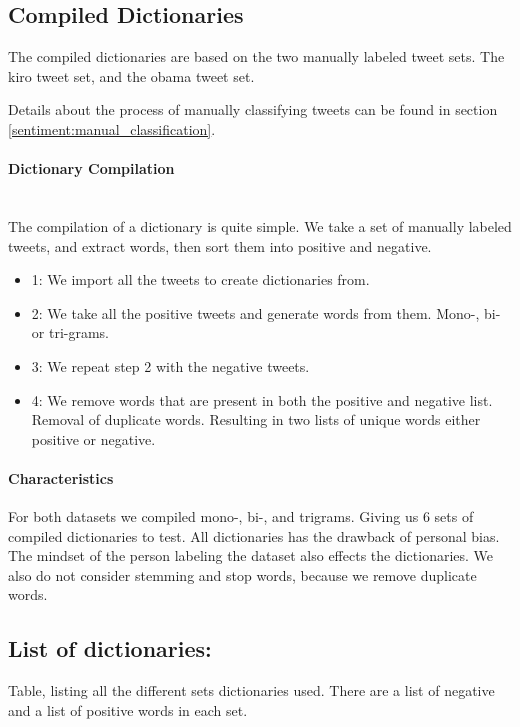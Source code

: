 \subsection{Compiled Dictionaries}
The compiled dictionaries are based on the two manually labeled tweet sets. The
kiro tweet set, and the obama tweet set.

Details about the process of manually classifying tweets can be found in section
\ref{sentiment:manual_classification}.

\paragraph{Dictionary Compilation}
\hspace{0pt}\\
The compilation of a dictionary is quite simple. We take a set of manually
labeled tweets, and extract words, then sort them into positive and negative.
\begin{itemize}
    \item 1: We import all the tweets to create dictionaries from. 
    \item 2: We take all the positive tweets and generate words from them.
Mono-, bi- or tri-grams. 
    \item 3: We repeat step 2 with the negative tweets. 
    \item 4: We remove words that are present in both the positive and negative
list. Removal of duplicate words. Resulting in two lists of unique words either
positive or negative.  
\end{itemize}

\paragraph{Characteristics}
For both datasets we compiled mono-, bi-, and trigrams. Giving us 6 sets of
compiled dictionaries to test. All dictionaries has the drawback of personal
bias. The mindset of the person labeling the dataset also effects the
dictionaries. We also do not consider stemming and stop words, because we
remove duplicate words.  
%

\subsection{List of dictionaries:}
Table, listing all the different sets dictionaries used. There are a list of
negative and a list of positive words in each set. 

